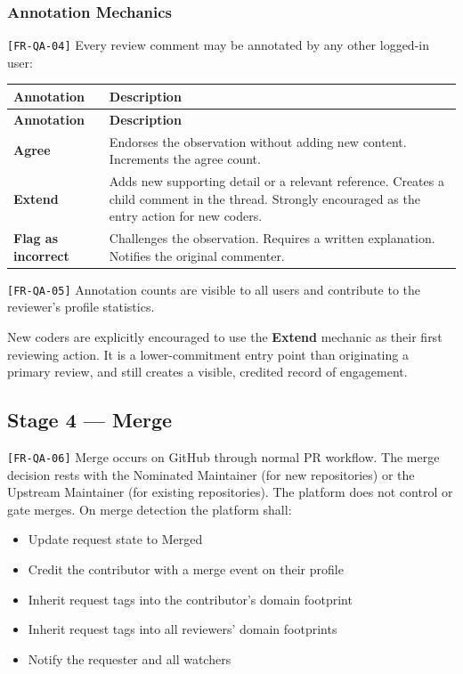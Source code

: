 \documentclass[12pt,a4paper]{article}
\begin{document}
\subsubsection{Annotation Mechanics}
\texttt{[FR-QA-04]} Every review comment may be annotated by any other logged-in user:

\begin{longtable}{L{3.5cm} L{9.8cm}}
  \color{white}\bfseries Annotation & \color{white}\bfseries Description \\
  \endfirsthead
  \color{white}\bfseries Annotation & \color{white}\bfseries Description \\
  \endhead\hline
  \textbf{Agree}             & Endorses the observation without adding new content. Increments the agree count. \\
  \textbf{Extend}            & Adds new supporting detail or a relevant reference. Creates a child comment in the thread. Strongly encouraged as the entry action for new coders. \\
  \textbf{Flag as incorrect} & Challenges the observation. Requires a written explanation. Notifies the original commenter. \\
  \hline
\end{longtable}

\texttt{[FR-QA-05]} Annotation counts are visible to all users and contribute to the reviewer's profile statistics.

\begin{successbox}
New coders are explicitly encouraged to use the \textbf{Extend} mechanic as their first reviewing action. It is a lower-commitment entry point than originating a primary review, and still creates a visible, credited record of engagement.
\end{successbox}

\subsection{Stage 4 --- Merge}
\texttt{[FR-QA-06]} Merge occurs on GitHub through normal PR workflow. The merge decision rests with the Nominated Maintainer (for new repositories) or the Upstream Maintainer (for existing repositories). The platform does not control or gate merges. On merge detection the platform shall:
\begin{itemize}
  \item Update request state to Merged
  \item Credit the contributor with a merge event on their profile
  \item Inherit request tags into the contributor's domain footprint
  \item Inherit request tags into all reviewers' domain footprints
  \item Notify the requester and all watchers
\end{itemize}
\end{document}
